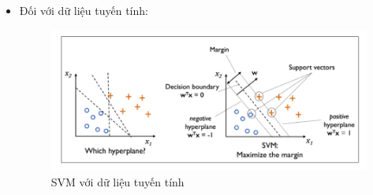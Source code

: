 \begin{itemize}
    \item Đối với dữ liệu tuyến tính:
    \begin{figure}[H]
        \begin{center}
            \includegraphics[scale=0.3]{images/theo3/SVM-ex-2}
            \caption{SVM với dữ liệu tuyến tính}
        \end{center}
    \end{figure}


\end{itemize}
